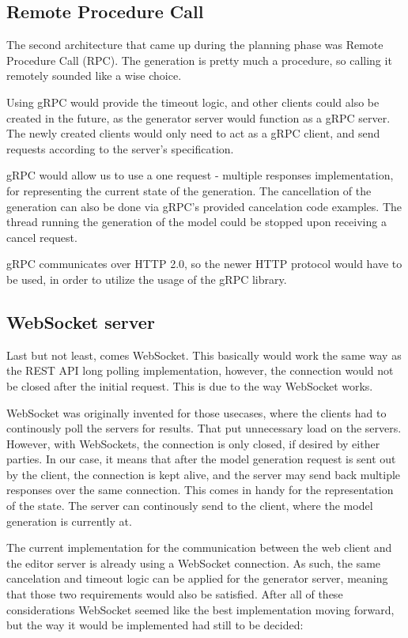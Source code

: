 \subsection{Remote Procedure Call} \label{rpcconsiderations}
	The second architecture that came up during the planning phase was Remote Procedure Call (RPC). The generation is pretty much
	a procedure, so calling it remotely sounded like a wise choice. 

	Using gRPC would provide the timeout logic, and other clients
	could also be created in the future, as the generator server would function as a gRPC server. The newly created clients would only need to
	act as a gRPC client, and send requests according to the server's specification.

	gRPC would allow us to use a one request - multiple responses implementation, for representing the current state of the generation.
	The cancellation of the generation can also be done via gRPC's provided cancelation code examples. The thread running the generation of
	the model could be stopped upon receiving a cancel request.

	gRPC communicates over HTTP 2.0, so the newer HTTP protocol would have to be used, in order to utilize the usage of the gRPC library.

\subsection{WebSocket server}
	Last but not least, comes WebSocket. This basically would work the same way as the REST API long polling implementation,
	however, the connection would not be closed after the initial request. This is due to the way WebSocket works.
	
	WebSocket was originally invented for those usecases, where the clients
	had to continously poll the servers for results. That put unnecessary load on the servers. However, with WebSockets, the connection 
	is only closed, if desired by either parties. In our case, it means that after the model generation request is sent out by the client,
	the connection is kept alive, and the server may send back multiple responses over the same connection.
	This comes in handy for the representation of the state. The server can continously send to the client,
	where the model generation is currently at.

	The current implementation for the communication between the web client and the editor server is already using a WebSocket connection.
	As such, the same cancelation and timeout logic can be applied for the generator server, meaning that those two requirements would also be satisfied.
	After all of these considerations WebSocket seemed like the best implementation moving forward, but the way it would be implemented
	had still to be decided:

